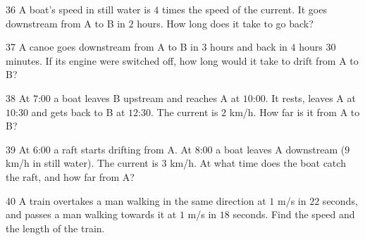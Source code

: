 \gap
\begin{probbox}{36}{}
A boat's speed in still water is $4$ times the speed of the current. It goes downstream from A to B in $2$ hours. How long does it take to go back?
\end{probbox}
\gap
\begin{probbox}{37}{}
A canoe goes downstream from A to B in $3$ hours and back in $4$ hours $30$ minutes. If its engine were switched off, how long would it take to drift from A to B?
\end{probbox}
\gap
\begin{probbox}{38}{}
At $7$:$00$ a boat leaves B upstream and reaches A at $10$:$00$. It rests, leaves A at $10$:$30$ and gets back to B at $12$:$30$. The current is $2$ km/h. How far is it from A to B?
\end{probbox}
\gap
\begin{probbox}{39}{}
At $6$:$00$ a raft starts drifting from A. At $8$:$00$ a boat leaves A downstream ($9$ km/h in still water). The current is $3$ km/h. At what time does the boat catch the raft, and how far from A?
\end{probbox}
\gap
\begin{probbox}{40}{}
A train overtakes a man walking in the same direction at $1$ m/s in $22$ seconds, and passes a man walking towards it at $1$ m/s in $18$ seconds. Find the speed and the length of the train.
\end{probbox}
